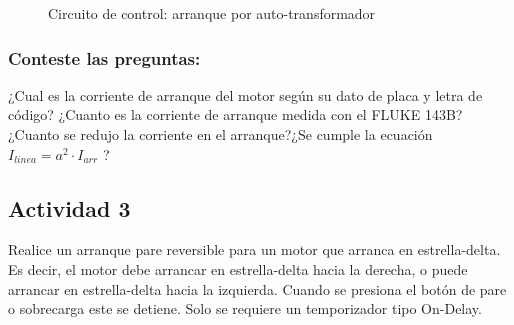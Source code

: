 \begin{figure}[H]
\centering
    \caption{Circuito de control: arranque por auto-transformador}
    \label{fig:control-auto-transformador}
\end{figure}

 
 
\subsubsection{Conteste las preguntas:}

¿Cual es la corriente de arranque del motor según su dato de placa y letra de código? ¿Cuanto es la corriente de arranque medida con el FLUKE 143B? ¿Cuanto se redujo la corriente en el arranque?¿Se cumple la ecuación $I_{linea} = a^{2}\cdot I_{arr}$ ?

\subsection{Actividad 3}

Realice un arranque pare reversible para un motor que arranca en estrella-delta. Es decir, el motor debe arrancar en estrella-delta hacia la derecha, o puede arrancar en estrella-delta hacia la izquierda. Cuando se presiona el botón de pare o sobrecarga este se detiene. Solo se requiere un temporizador tipo On-Delay.

